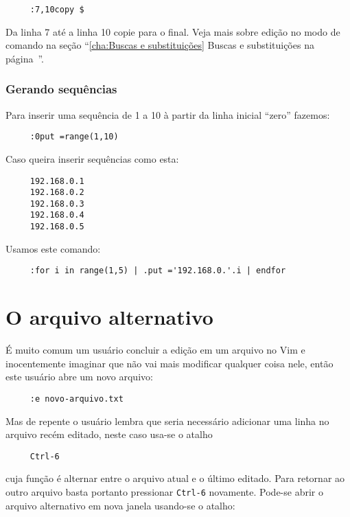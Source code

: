 \begin{verbatim}
     :7,10copy $
\end{verbatim}

Da linha 7 até a linha 10 copie para o final. {\Large {}}
Veja mais sobre edição no modo de comando na seção ``\ref{cha:Buscas e
substituições} Buscas e substituições na página~\pageref{cha:Buscas e substituições}''.

\subsubsection{Gerando sequências}
Para inserir uma sequência de 1 a 10 à partir da linha inicial ``zero'' fazemos:

\begin{verbatim}
     :0put =range(1,10)
\end{verbatim}

Caso queira inserir sequências como esta:

\begin{verbatim}
     192.168.0.1
     192.168.0.2
     192.168.0.3
     192.168.0.4
     192.168.0.5
\end{verbatim}

Usamos este comando:

\begin{verbatim}
     :for i in range(1,5) | .put ='192.168.0.'.i | endfor
\end{verbatim}

\section{O arquivo alternativo}
\label{O arquivo alternativo}

É muito comum um usuário concluir a edição em um arquivo no Vim e
inocentemente imaginar que não vai mais modificar qualquer coisa nele, então
este usuário abre um novo arquivo:

\begin{verbatim}
     :e novo-arquivo.txt
\end{verbatim}

Mas de repente o usuário lembra que seria necessário adicionar uma linha no
arquivo recém editado, neste caso usa-se o atalho

\begin{verbatim}
     Ctrl-6
\end{verbatim}

cuja função é alternar entre o arquivo atual e o último editado. Para retornar
ao outro arquivo basta portanto pressionar \verb|Ctrl-6| novamente. Pode-se 
abrir o arquivo alternativo em nova janela usando-se o atalho:

